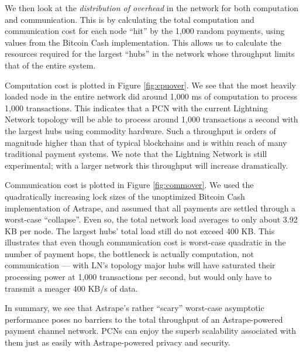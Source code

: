 \documentclass[USenglish,oneside,twocolumn]{article}
\begin{document}
We then look at the \emph{distribution of overhead} in the network for both computation and communication. This is by calculating the total computation and communication cost for each node ``hit'' by the 1,000 random payments, using values from the Bitcoin Cash implementation. This allows us to calculate the resources required for the largest ``hubs'' in the network whose throughput limits that of the entire system.

Computation cost is plotted in Figure \ref{fig:cpuover}. We see that the most heavily loaded node in the entire network did around 1,000 ms of computation to process 1,000 transactions. This indicates that a PCN with the current Lightning Network topology will be able to process around 1,000 transactions a second with the largest hubs using commodity hardware. Such a throughput is orders of magnitude higher than that of typical blockchains and is within reach of many traditional payment systems. We note that the Lightning Network is still experimental; with a larger network this throughput will increase dramatically.

Communication cost is plotted in Figure \ref{fig:commover}. We used the quadratically increasing lock sizes of the unoptimized Bitcoin Cash implementation of Astrape, and assumed that all payments are settled through a worst-case ``collapse''. Even so, the total network load averages to only about 3.92 KB per node. The largest hubs' total load still do not exceed 400 KB. This illustrates that even though communication cost is worst-case quadratic in the number of payment hops, the bottleneck is actually computation, not communication --- with LN's topology major hubs will have saturated their processing power at 1,000 transactions per second, but would only have to transmit a meager 400 KB/s of data.

In summary, we see that Astrape's rather ``scary'' worst-case asymptotic performance poses no barriers to the total throughput of an Astrape-powered payment channel network. PCNs can enjoy the superb scalability associated with them just as easily with Astrape-powered privacy and security.


\end{document}
